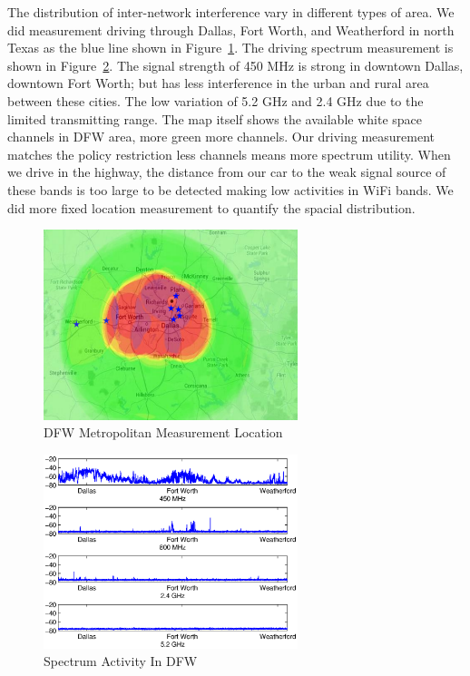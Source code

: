 The distribution of inter-network interference vary in different types of area.
We did measurement driving through Dallas, Fort Worth, and Weatherford in north 
Texas as the blue line shown in Figure~\ref{fig:drivemap}.
The driving spectrum measurement is shown in Figure~\ref{fig:drivetest}.
The signal strength of 450 MHz is strong in downtown Dallas, downtown Fort Worth;
but has less interference in the urban and rural area between these cities.
The low variation of 5.2 GHz and 2.4 GHz due to the limited transmitting range.
The map itself shows the available white space channels in DFW area, more green
more channels. Our driving measurement matches the policy restriction less channels means
more spectrum utility.
When we drive in the highway, the distance from our car to the weak signal 
source of these bands is too large to be detected making low activities in 
WiFi bands. We did more fixed location 
measurement to quantify the spacial distribution. 
   \begin{figure}
   \centering
   \includegraphics[width=74mm]{figures/drivemap}
   \vspace{-0.1in}
   \caption{DFW Metropolitan Measurement Location}                                                                 
   \label{fig:drivemap}
   \end{figure}
   
   
   \begin{figure}
   \centering
   \includegraphics[width=74mm]{figures/drivetest}
   \vspace{-0.1in}
   \caption{Spectrum Activity In DFW}                                                                 
   \label{fig:drivetest}
   \end{figure}

